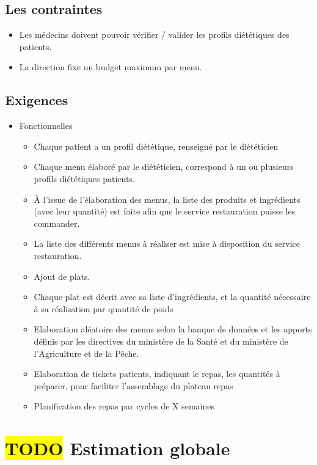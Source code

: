 \subsection{Les contraintes}
\begin{itemize}
\item Les médecins doivent pouvoir vérifier / valider les profils diététiques des patients.
\item La direction fixe un budget maximum par menu.
\end{itemize}

\subsection{Exigences}
\begin{itemize}
\item Fonctionnelles
  \begin{itemize}
  \item Chaque patient a un profil diététique, renseigné par le diététicien
  \item Chaque menu élaboré par le diététicien, correspond à un ou plusieurs profils diététiques patients.
  \item À l'issue de l'élaboration des menus, la liste des produits et
    ingrédients (avec leur quantité) est faite afin que le service
    restauration puisse les commander.
  \item La liste des différents menus à réaliser est mise à disposition du service restauration.
  \item Ajout de plats.
  \item Chaque plat est décrit avec sa liste d'ingrédients, et la quantité nécessaire à sa réalisation par quantité de poids
  \item Elaboration aléatoire des menus selon la banque de données et les apports définis par les directives
        du ministère de la Santé et du ministère de l’Agriculture et de la Pêche.
  \item Elaboration de tickets patients, indiquant le repas, les quantités à préparer, pour faciliter l'assemblage du plateau repas
  \item Planification des repas par cycles de X semaines
  \end{itemize}
\end{itemize}

\section{\colorbox{yellow}{TODO} Estimation globale}
